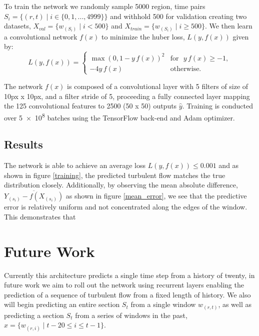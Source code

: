 \documentclass[10pt,letterpaper]{article}
\begin{document}
To train the network we randomly sample 5000 region, time pairs $S_i = \{(r, t) \mid i \in \{0, 1, ..., 4999\} \}$ and withhold 500 for validation creating two datasets, $X_{val} = \{w_{(S_i)} \mid i < 500 \} $ and $X_{train} = \{ {w_{(S_i)}\mid i \geq 500} \}$. We then learn a convolutional network $f(x)$ to minimize the huber loss, $L(y, f(x))$ given by:
$$L(y, f(x)) = \begin{cases}
	\max(0, 1 - y \, f(x))^2 & \textrm{for }\, \,  y \, f(x) \ge -1, \\
	-4y \, f(x)              & \textrm{otherwise.}
\end{cases}$$

The network $f(x)$ is composed of a convolutional layer with 5 filters of size of 10px x 10px, and a filter stride of 5, proceeding a fully connected layer mapping the 125 convolutional features to 2500 (50 x 50) outputs $\hat{y}$. Training is conducted over \num{5e+8} batches using the TensorFlow back-end and Adam optimizer.


\subsection{Results}
 The network is able to achieve an average loss $L(y, f(x)) \leq 0.001$ and as shown in figure \ref{training}, the predicted turbulent flow matches the true distribution closely. Additionally, by observing the mean absolute difference, $\overline{Y_{(s_i)} - f(X_{(s_i)})}$ as shown in figure \ref{mean_error}, we see that the predictive error is relatively uniform and not concentrated along the edges of the window. This demonstrates that 





\section{Future Work}
Currently this architecture predicts a single time step from a history of twenty, in future work we aim to roll out the network using recurrent layers enabling the prediction of a sequence of turbulent flow from a fixed length of history. We also will begin predicting an entire section $S_t$ from a single window $w_(r,t)$, as well as predicting a section $S_t$ from a series of windows in the past, $x = \{w_{(r,i)} \mid t-20 \leq i \leq t-1 \}$. 
\end{document}

